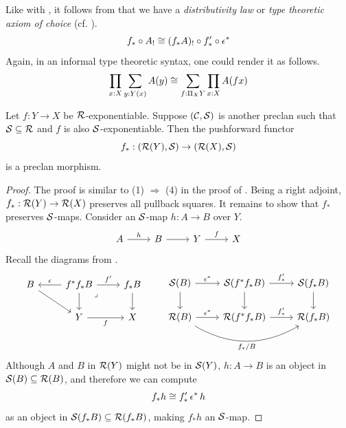 Like with , 
it follows from  that we have a \emph{distributivity law}
or \emph{type theoretic axiom of choice}
(cf. \cite[Proposition 2.4.15]{joyal2017}).
\begin{equation}
  f_* \circ A_! \cong (f_* A)_! \circ f'_* \circ \epsilon^* 
\end{equation}
Again, in an informal type theoretic syntax, one could render it as follows.
\[
  \prod_{x : X} \sum_{y : Y(x)} A(y) \cong \sum_{f : \Pi_{X} Y} \prod_{x : X} A(f x)
\]

\begin{lemma}\label{lem:pushforward-preserves-maps}
  Let $f : Y \to X$ be $\mathcal{R}$-exponentiable.
  Suppose $(\mathcal{C},\mathcal{S})$ is another preclan such that $\mathcal{S} \subseteq \mathcal{R}$
  and $f$ is also $\mathcal{S}$-exponentiable.
  Then the pushforward functor
  \[ f_* : (\mathcal{R}(Y), \mathcal{S}) \to (\mathcal{R}(X), \mathcal{S})\]
  is a preclan morphism.
\end{lemma}
\begin{proof}
  The proof is similar to (1) $\Rightarrow$ (4) in the proof of .
  Being a right adjoint, $f_* : \mathcal{R}(Y) \to \mathcal{R}(X)$ preserves all pullback squares.
  It remains to show that $f_*$ preserves $\mathcal{S}$-maps.
  Consider an $\mathcal{S}$-map $h : A \to B$ over $Y$.
  \[\begin{tikzcd}
    A & B & Y & X
    \arrow["h", from=1-1, to=1-2]
    \arrow[from=1-2, to=1-3]
    \arrow["f", from=1-3, to=1-4]
  \end{tikzcd}\]
  Recall the diagrams from .
  \[\begin{tikzcd}
    B & {f^* f_* B} & {f_* B} \\
    & Y & X
    \arrow[from=1-1, to=2-2]
    \arrow["{\epsilon}"', from=1-2, to=1-1]
    \arrow["{f'}", from=1-2, to=1-3]
    \arrow[from=1-2, to=2-2]
    \arrow["\lrcorner"{anchor=center, pos=0.125}, draw=none, from=1-2, to=2-3]
    \arrow[from=1-3, to=2-3]
    \arrow["f"', from=2-2, to=2-3]
  \end{tikzcd}
  \quad \quad
  \begin{tikzcd}
    {\SS(B)} & {\SS(f^* f_* B)} & {\SS(f_* B)} \\
    {\RR(B)} & {\RR(f^* f_* B)} & {\RR(f_* B)}
    \arrow["{{{\epsilon^*}}}", from=1-1, to=1-2]
    \arrow[from=1-1, to=2-1]
    \arrow["{{f'_*}}", from=1-2, to=1-3]
    \arrow[from=1-2, to=2-2]
    \arrow[from=1-3, to=2-3]
    \arrow["{{{\epsilon^*}}}", from=2-1, to=2-2]
    \arrow["{{f_*/B}}"', bend right, from=2-1, to=2-3]
    \arrow["{{f'_*}}", from=2-2, to=2-3]
  \end{tikzcd}
  \]
  Although $A$ and $B$ in $\mathcal{R}(Y)$ might not be in $\mathcal{S}(Y)$,
  $h : A \to B$ is an object in $\mathcal{S}(B) \subseteq \mathcal{R}(B)$,
  and therefore we can compute
  \[f_* h \cong f'_* \, \epsilon^* \, h\]
  as an object in $\mathcal{S}(f_* B) \subseteq \mathcal{R}(f_* B)$,
  making $f_* h$ an $\mathcal{S}$-map.
\end{proof}

